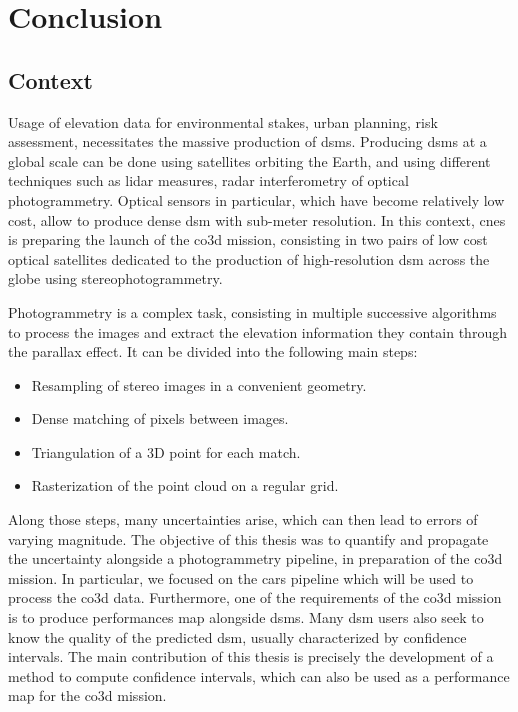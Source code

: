 \chapter*{Conclusion}
\section*{Context}
Usage of elevation data for environmental stakes, urban planning, risk assessment, \etc necessitates the massive production of \acrlong{dsm}s. Producing \acrshort{dsm}s at a global scale can be done using satellites orbiting the Earth, and using different techniques such as \acrshort{lidar} measures, radar interferometry of optical photogrammetry. Optical sensors in particular, which have become relatively low cost, allow to produce dense \acrshort{dsm} with sub-meter resolution. In this context, \acrshort{cnes} is preparing the launch of the \acrshort{co3d} mission, consisting in two pairs of low cost optical satellites dedicated to the production of high-resolution \acrshort{dsm} across the globe using stereophotogrammetry.

Photogrammetry is a complex task, consisting in multiple successive algorithms to process the images and extract the elevation information they contain through the parallax effect. It can be divided into the following main steps:
\begin{itemize}
    \item Resampling of stereo images in a convenient geometry.
    \item Dense matching of pixels between images.
    \item Triangulation of a 3D point for each match.
    \item Rasterization of the point cloud on a regular grid.
\end{itemize}
Along those steps, many uncertainties arise, which can then lead to errors of varying magnitude. The objective of this thesis was to quantify and propagate the uncertainty alongside a photogrammetry pipeline, in preparation of the \acrshort{co3d} mission. In particular, we focused on the \acrshort{cars} pipeline which will be used to process the \acrshort{co3d} data. Furthermore, one of the requirements of the \acrshort{co3d} mission is to produce performances map alongside \acrshort{dsm}s. Many \acrshort{dsm} users also seek to know the quality of the predicted \acrshort{dsm}, usually characterized by confidence intervals. The main contribution of this thesis is precisely the development of a method to compute confidence intervals, which can also be used as a performance map for the \acrshort{co3d} mission.

